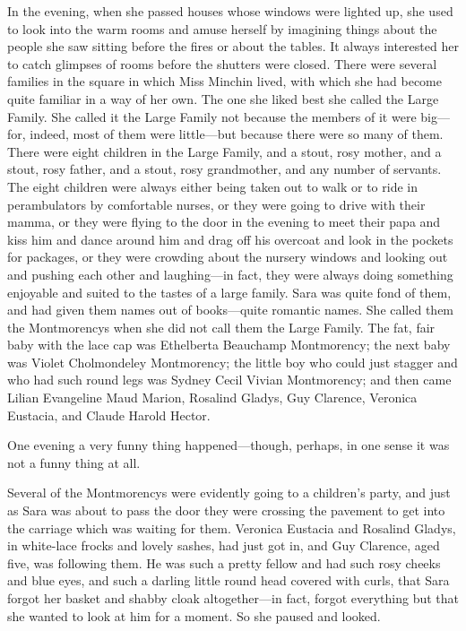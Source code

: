 In the evening, when she passed houses whose windows were lighted up, she used to look into the warm rooms and amuse herself by imagining things about the people she saw sitting before the fires or about the tables. It always interested her to catch glimpses of rooms before the shutters were closed. There were several families in the square in which Miss Minchin lived, with which she had become quite familiar in a way of her own. The one she liked best she called the Large Family. She called it the Large Family not because the members of it were big—for, indeed, most of them were little—but because there were so many of them. There were eight children in the Large Family, and a stout, rosy mother, and a stout, rosy father, and a stout, rosy grandmother, and any number of servants. The eight children were always either being taken out to walk or to ride in perambulators by comfortable nurses, or they were going to drive with their mamma, or they were flying to the door in the evening to meet their papa and kiss him and dance around him and drag off his overcoat and look in the pockets for packages, or they were crowding about the nursery windows and looking out and pushing each other and laughing—in fact, they were always doing something enjoyable and suited to the tastes of a large family. Sara was quite fond of them, and had given them names out of books—quite romantic names. She called them the Montmorencys when she did not call them the Large Family. The fat, fair baby with the lace cap was Ethelberta Beauchamp Montmorency; the next baby was Violet Cholmondeley Montmorency; the little boy who could just stagger and who had such round legs was Sydney Cecil Vivian Montmorency; and then came Lilian Evangeline Maud Marion, Rosalind Gladys, Guy Clarence, Veronica Eustacia, and Claude Harold Hector.

One evening a very funny thing happened—though, perhaps, in one sense it was not a funny thing at all.

Several of the Montmorencys were evidently going to a children's party, and just as Sara was about to pass the door they were crossing the pavement to get into the carriage which was waiting for them. Veronica Eustacia and Rosalind Gladys, in white-lace frocks and lovely sashes, had just got in, and Guy Clarence, aged five, was following them. He was such a pretty fellow and had such rosy cheeks and blue eyes, and such a darling little round head covered with curls, that Sara forgot her basket and shabby cloak altogether—in fact, forgot everything but that she wanted to look at him for a moment. So she paused and looked.

